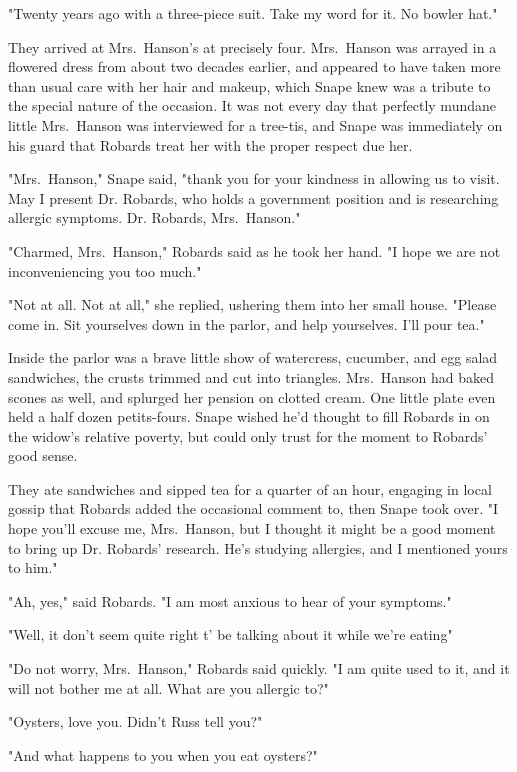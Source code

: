 "Twenty years ago with a three-piece suit. Take my word for it. No bowler hat."

They arrived at Mrs.~Hanson's at precisely four. Mrs.~Hanson was arrayed in a flowered dress from about two decades earlier, and appeared to have taken more than usual care with her hair and makeup, which Snape knew was a tribute to the special nature of the occasion. It was not every day that perfectly mundane little Mrs.~Hanson was interviewed for a tree-tis, and Snape was immediately on his guard that Robards treat her with the proper respect due her.

"Mrs.~Hanson," Snape said, "thank you for your kindness in allowing us to visit. May I present Dr. Robards, who holds a government position and is researching allergic symptoms. Dr. Robards, Mrs.~Hanson."

"Charmed, Mrs.~Hanson," Robards said as he took her hand. "I hope we are not inconveniencing you too much."

"Not at all. Not at all," she replied, ushering them into her small house. "Please come in. Sit yourselves down in the parlor, and help yourselves. I'll pour tea."

Inside the parlor was a brave little show of watercress, cucumber, and egg salad sandwiches, the crusts trimmed and cut into triangles. Mrs.~Hanson had baked scones as well, and splurged her pension on clotted cream. One little plate even held a half dozen petits-fours. Snape wished he'd thought to fill Robards in on the widow's relative poverty, but could only trust for the moment to Robards' good sense.

They ate sandwiches and sipped tea for a quarter of an hour, engaging in local gossip that Robards added the occasional comment to, then Snape took over. "I hope you'll excuse me, Mrs.~Hanson, but I thought it might be a good moment to bring up Dr. Robards' research. He's studying allergies, and I mentioned yours to him."

"Ah, yes," said Robards. "I am most anxious to hear of your symptoms."

"Well, it don't seem quite right t' be talking about it while we're eating{\el}"

"Do not worry, Mrs.~Hanson," Robards said quickly. "I am quite used to it, and it will not bother me at all. What are you allergic to?"

"Oysters, love you. Didn't Russ tell you?"

"And what happens to you when you eat oysters?"

